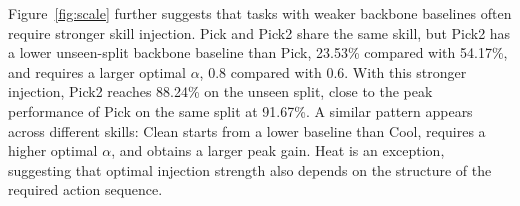 Figure~\ref{fig:scale} further suggests that tasks with weaker backbone baselines often require stronger skill injection. Pick and Pick2 share the same skill, but Pick2 has a lower unseen-split backbone baseline than Pick, 23.53\% compared with 54.17\%, and requires a larger optimal $\alpha$, 0.8 compared with 0.6. With this stronger injection, Pick2 reaches 88.24\% on the unseen split, close to the peak performance of Pick on the same split at 91.67\%. A similar pattern appears across different skills: Clean starts from a lower baseline than Cool, requires a higher optimal $\alpha$, and obtains a larger peak gain. Heat is an exception, suggesting that optimal injection strength also depends on the structure of the required action sequence.


